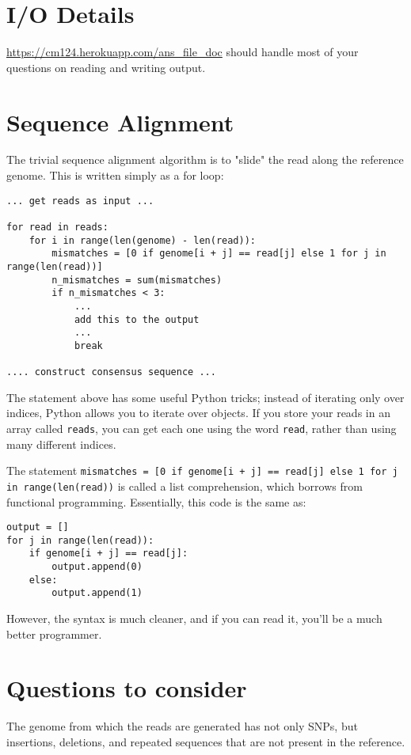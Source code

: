 \documentclass{article}
\begin{document}
\section*{I/O Details}
\url{https://cm124.herokuapp.com/ans_file_doc} should handle most of your questions on reading and writing output.

\section*{Sequence Alignment}
The trivial sequence alignment algorithm is to "slide" the read along the reference genome. This is written simply as a for loop:

\begin{verbatim}
... get reads as input ...

for read in reads:
    for i in range(len(genome) - len(read)):
	    mismatches = [0 if genome[i + j] == read[j] else 1 for j in range(len(read))]
	    n_mismatches = sum(mismatches)
	    if n_mismatches < 3:
		    ...
		    add this to the output
		    ...
		    break
		    
.... construct consensus sequence ...
\end{verbatim}

The statement above has some useful Python tricks; instead of iterating only over indices, Python allows you to iterate over objects. If you store your reads in an array called \verb!reads!, you can get each one using the word \verb!read!, rather than using many different indices.

The statement \verb~mismatches = [0 if genome[i + j] == read[j] else 1 for j in range(len(read))~ is called a list comprehension, which borrows from functional programming. Essentially, this code is the same as:

\begin{verbatim}
output = []
for j in range(len(read)):
	if genome[i + j] == read[j]:
		output.append(0)
	else:
		output.append(1)
\end{verbatim}

However, the syntax is much cleaner, and if you can read it, you'll be a much better programmer.

\section*{Questions to consider}
The genome from which the reads are generated has not only SNPs, but insertions, deletions, and repeated sequences that are not present in the reference. 
\end{document}
